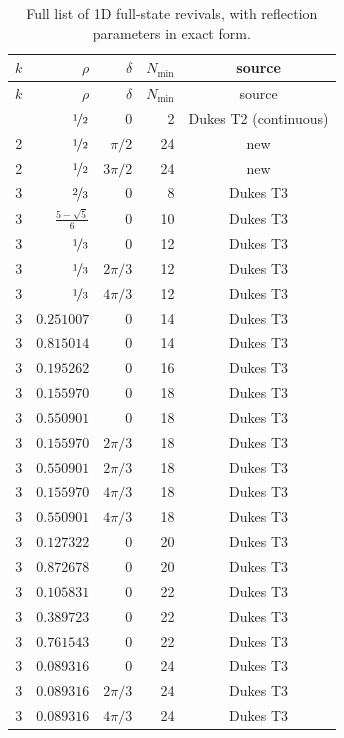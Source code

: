 \clearpage
\begin{longtable}{rrrrc}
\caption{Full list of 1D full-state revivals, with reflection parameters in exact form.}\label{tab:1d-catalogue-exact} \\
\toprule
$k$ & $\rho$ & $\delta$ & $N_{\min}$ & source \\
\midrule
\endfirsthead
\toprule
$k$ & $\rho$ & $\delta$ & $N_{\min}$ & source \\
\midrule
\endhead
\bottomrule
\endfoot
2 & $\nicefrac{1}{2}$ & $0$ & 2 & Dukes T2 (continuous) \\
2 & $\nicefrac{1}{2}$ & $\pi/2$ & 24 & new \\
2 & $\nicefrac{1}{2}$ & $3\pi/2$ & 24 & new \\
3 & $\nicefrac{2}{3}$ & $0$ & 8 & Dukes T3 \\
3 & $\frac{5 - \sqrt{5}}{6}$ & $0$ & 10 & Dukes T3 \\
3 & $\nicefrac{1}{3}$ & $0$ & 12 & Dukes T3 \\
3 & $\nicefrac{1}{3}$ & $2\pi/3$ & 12 & Dukes T3 \\
3 & $\nicefrac{1}{3}$ & $4\pi/3$ & 12 & Dukes T3 \\
3 & $0.251007$ & $0$ & 14 & Dukes T3 \\
3 & $0.815014$ & $0$ & 14 & Dukes T3 \\
3 & $0.195262$ & $0$ & 16 & Dukes T3 \\
3 & $0.155970$ & $0$ & 18 & Dukes T3 \\
3 & $0.550901$ & $0$ & 18 & Dukes T3 \\
3 & $0.155970$ & $2\pi/3$ & 18 & Dukes T3 \\
3 & $0.550901$ & $2\pi/3$ & 18 & Dukes T3 \\
3 & $0.155970$ & $4\pi/3$ & 18 & Dukes T3 \\
3 & $0.550901$ & $4\pi/3$ & 18 & Dukes T3 \\
3 & $0.127322$ & $0$ & 20 & Dukes T3 \\
3 & $0.872678$ & $0$ & 20 & Dukes T3 \\
3 & $0.105831$ & $0$ & 22 & Dukes T3 \\
3 & $0.389723$ & $0$ & 22 & Dukes T3 \\
3 & $0.761543$ & $0$ & 22 & Dukes T3 \\
3 & $0.089316$ & $0$ & 24 & Dukes T3 \\
3 & $0.089316$ & $2\pi/3$ & 24 & Dukes T3 \\
3 & $0.089316$ & $4\pi/3$ & 24 & Dukes T3 \\

\end{longtable}
